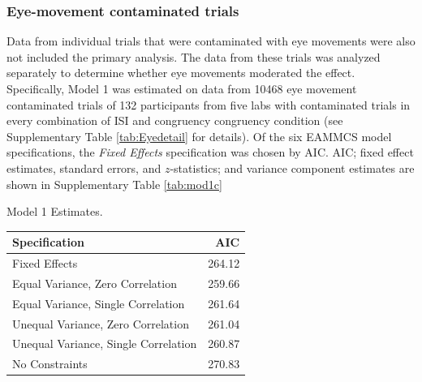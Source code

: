 \documentclass[man,floatsintext]{apa6}
\theoremstyle{definition}
\theoremstyle{definition}
\theoremstyle{definition}
\theoremstyle{remark}
\begin{document}
\begin{appendix}
\subsubsection{Eye-movement contaminated
trials}\label{eye-movement-contaminated-trials}

Data from individual trials that were contaminated with eye movements
were also not included the primary analysis. The data from these trials
was analyzed separately to determine whether eye movements moderated the
effect. Specifically, Model 1 was estimated on data from 10468 eye
movement contaminated trials of 132 participants from five labs with
contaminated trials in every combination of ISI and congruency
congruency condition (see Supplementary Table \ref{tab:Eyedetail} for
details). Of the six EAMMCS model specifications, the \emph{Fixed
Effects} specification was chosen by AIC. AIC; fixed effect estimates,
standard errors, and \(z\)-statistics; and variance component estimates
are shown in Supplementary Table \ref{tab:mod1c}

\begin{table}[!p]
\caption{\label{tab:mod1}Model 1 Estimates.}
\begin{subtable}{\textwidth}
\centering
\begin{table}[H]\centering\begingroup\fontsize{10}{12}\selectfont

\begin{tabular}{lr}
\toprule
Specification & AIC\\
\midrule
Fixed Effects & 264.12\\
Equal Variance, Zero Correlation & 259.66\\
Equal Variance, Single Correlation & 261.64\\
Unequal Variance, Zero Correlation & 261.04\\
Unequal Variance, Single Correlation & 260.87\\
No Constraints & 270.83\\
\bottomrule
\end{tabular}\endgroup{}
\end{table}
\end{subtable}
\begin{subtable}{\textwidth}
\caption{Fixed Effect Estimates}
\centering
\begin{table}[H]\centering\begingroup\fontsize{10}{12}\selectfont


\end{table}
\end{subtable}
\end{table}
\end{appendix}
\end{document}
